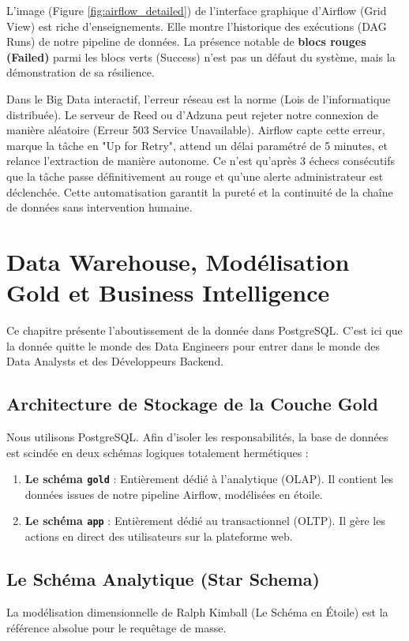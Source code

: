 \documentclass[12pt,a4paper,twoside]{report}
\begin{document}
L'image (Figure \ref{fig:airflow_detailed}) de l'interface graphique d'Airflow (Grid View) est riche d'enseignements. Elle montre l'historique des exécutions (DAG Runs) de notre pipeline de données. 
La présence notable de \textbf{blocs rouges (Failed)} parmi les blocs verts (Success) n'est pas un défaut du système, mais la démonstration de sa résilience. 

Dans le Big Data interactif, l'erreur réseau est la norme (Lois de l'informatique distribuée). Le serveur de Reed ou d'Adzuna peut rejeter notre connexion de manière aléatoire (Erreur 503 Service Unavailable). Airflow capte cette erreur, marque la tâche en "Up for Retry", attend un délai paramétré de 5 minutes, et relance l'extraction de manière autonome. Ce n'est qu'après 3 échecs consécutifs que la tâche passe définitivement au rouge et qu'une alerte administrateur est déclenchée. Cette automatisation garantit la pureté et la continuité de la chaîne de données sans intervention humaine.

\chapter{Data Warehouse, Modélisation Gold et Business Intelligence}

Ce chapitre présente l'aboutissement de la donnée dans PostgreSQL. C'est ici que la donnée quitte le monde des Data Engineers pour entrer dans le monde des Data Analysts et des Développeurs Backend.

\section{Architecture de Stockage de la Couche Gold}
Nous utilisons PostgreSQL. Afin d'isoler les responsabilités, la base de données est scindée en deux schémas logiques totalement hermétiques :
\begin{enumerate}
    \item \textbf{Le schéma \texttt{gold}} : Entièrement dédié à l'analytique (OLAP). Il contient les données issues de notre pipeline Airflow, modélisées en étoile.
    \item \textbf{Le schéma \texttt{app}} : Entièrement dédié au transactionnel (OLTP). Il gère les actions en direct des utilisateurs sur la plateforme web.
\end{enumerate}

\section{Le Schéma Analytique (Star Schema)}
La modélisation dimensionnelle de Ralph Kimball (Le Schéma en Étoile) est la référence absolue pour le requêtage de masse.
\end{document}
